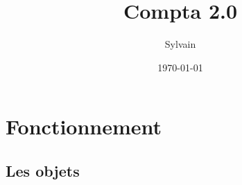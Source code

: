 \documentclass[a4paper,french]{report}
\begin{document}
\author{Sylvain}
\date{\today}
\title{Compta 2.0}

\maketitle

\tableofcontents
\newpage


\chapter{Fonctionnement}
\label{chap:func}
\section{Les objets}

\label{sec:object}
\end{document}
